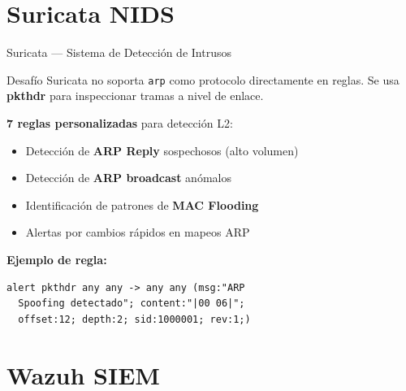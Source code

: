 \documentclass[aspectratio=169, 11pt]{beamer}
\begin{document}
\section{Suricata NIDS}

\begin{frame}[fragile]{Suricata --- Sistema de Detecci\'on de Intrusos}
\begin{block}{Desaf\'io}
Suricata no soporta \texttt{arp} como protocolo directamente en reglas.
Se usa \textbf{pkthdr} para inspeccionar tramas a nivel de enlace.
\end{block}
\vspace{0.5em}
\textbf{7 reglas personalizadas} para detecci\'on L2:
\begin{itemize}
    \item Detecci\'on de \textbf{ARP Reply} sospechosos (alto volumen)
    \item Detecci\'on de \textbf{ARP broadcast} an\'omalos
    \item Identificaci\'on de patrones de \textbf{MAC Flooding}
    \item Alertas por cambios r\'apidos en mapeos ARP
\end{itemize}
\vspace{0.5em}
\textbf{Ejemplo de regla:}
\begin{lstlisting}
alert pkthdr any any -> any any (msg:"ARP
  Spoofing detectado"; content:"|00 06|";
  offset:12; depth:2; sid:1000001; rev:1;)
\end{lstlisting}
\end{frame}

\section{Wazuh SIEM}
\end{document}
